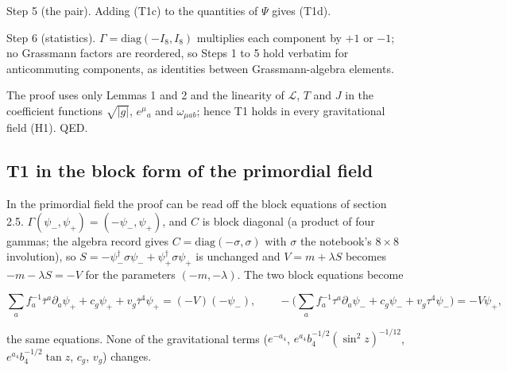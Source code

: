 \documentclass[11pt]{article}
\begin{document}
Step 5 (the pair). Adding (T1c) to the quantities of $\Psi$ gives (T1d).

Step 6 (statistics). $\Gamma = \mathrm{diag}(-I_8, I_8)$ multiplies each component by $+1$ or $-1$; no Grassmann factors are reordered, so Steps 1 to 5 hold verbatim for anticommuting components, as identities between Grassmann-algebra elements.

The proof uses only Lemmas 1 and 2 and the linearity of $\mathcal{L}$, $T$ and $J$ in the coefficient functions $\sqrt{|g|}$, $e^\mu{}_a$ and $\omega_{\mu ab}$; hence T1 holds in every gravitational field (H1). QED.

\subsection{T1 in the block form of the primordial field}

In the primordial field the proof can be read off the block equations of section 2.5. $\Gamma(\psi_-, \psi_+) = (-\psi_-, \psi_+)$, and $C$ is block diagonal (a product of four gammas; the algebra record gives $C = \mathrm{diag}(-\sigma, \sigma)$ with $\sigma$ the notebook's $8 \times 8$ involution), so $S = -\psi_-^\dagger\sigma\psi_- + \psi_+^\dagger\sigma\psi_+$ is unchanged and $V = m + \lambda S$ becomes $-m - \lambda S = -V$ for the parameters $(-m,-\lambda)$. The two block equations become

\[
\sum_a f_a^{-1}\bar\tau^a\partial_a\psi_+ + c_g\psi_+ + v_g\bar\tau^4\psi_+ = (-V)(-\psi_-),\qquad
-\Big(\sum_a f_a^{-1}\tau^a\partial_a\psi_- + c_g\psi_- + v_g\tau^4\psi_-\Big) = -V\psi_+ ,
\]

the same equations. None of the gravitational terms ($e^{-a_4}$, $e^{a_4}b_4^{-1/2}(\sin^2 z)^{-1/12}$, $e^{a_4}b_4^{-1/2}\tan z$, $c_g$, $v_g$) changes.
\end{document}
